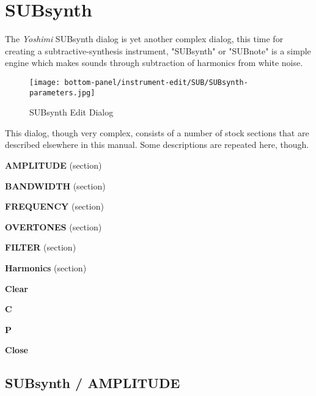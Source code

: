 %
%
%

\section{SUBsynth}
\label{sec:subsynth}

   The \textsl{Yoshimi} SUBsynth dialog is yet another complex dialog, this time
   for creating a subtractive-synthesis instrument,
   "SUBsynth" or "SUBnote" is a simple engine which makes sounds through
   subtraction of harmonics from white noise.  \cite{zyndoc}

\begin{figure}[H]
   \centering 
   \texttt{[image: bottom-panel/instrument-edit/SUB/SUBsynth-parameters.jpg]}
   \caption{SUBsynth Edit Dialog}
   \label{fig:subsynth_edit_dialog}
\end{figure}

   This dialog, though very complex, consists of a number of stock sections
   that are described elsewhere in this manual.
   Some descriptions are repeated here, though.

   \begin{enumber}
      \item \textbf{AMPLITUDE} (section)
      \item \textbf{BANDWIDTH} (section)
      \item \textbf{FREQUENCY} (section)
      \item \textbf{OVERTONES} (section)
      \item \textbf{FILTER} (section)
      \item \textbf{Harmonics} (section)
      \item \textbf{Clear}
      \item \textbf{C}
      \item \textbf{P}
      \item \textbf{Close}
   \end{enumber}

\subsection{SUBsynth / AMPLITUDE}
\label{subsec:subsynth_amplitude}

